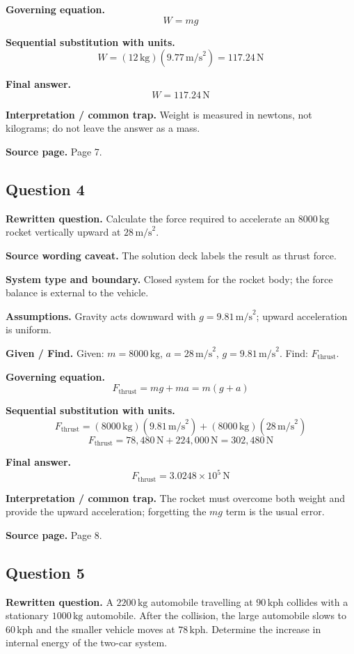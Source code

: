 \textbf{Governing equation.}
\[
W=mg
\]

\textbf{Sequential substitution with units.}
\[
W=(12\,\text{kg})(9.77\,\text{m/s}^2)=117.24\,\text{N}
\]

\textbf{Final answer.}
\[
\boxed{W=117.24\,\text{N}}
\]

\textbf{Interpretation / common trap.} Weight is measured in newtons, not kilograms; do not leave the answer as a mass.

\textbf{Source page.} Page 7.

\subsection*{Question 4}
\textbf{Rewritten question.} Calculate the force required to accelerate an $8000\,\text{kg}$ rocket vertically upward at $28\,\text{m/s}^2$.

\textbf{Source wording caveat.} The solution deck labels the result as thrust force.

\textbf{System type and boundary.} Closed system for the rocket body; the force balance is external to the vehicle.

\textbf{Assumptions.} Gravity acts downward with $g=9.81\,\text{m/s}^2$; upward acceleration is uniform.

\textbf{Given / Find.}
Given: $m=8000\,\text{kg}$, $a=28\,\text{m/s}^2$, $g=9.81\,\text{m/s}^2$.
Find: $F_{\text{thrust}}$.

\textbf{Governing equation.}
\[
F_{\text{thrust}}=mg+ma=m(g+a)
\]

\textbf{Sequential substitution with units.}
\[
F_{\text{thrust}}=(8000\,\text{kg})(9.81\,\text{m/s}^2)+(8000\,\text{kg})(28\,\text{m/s}^2)
\]
\[
F_{\text{thrust}}=78{,}480\,\text{N}+224{,}000\,\text{N}=302{,}480\,\text{N}
\]

\textbf{Final answer.}
\[
\boxed{F_{\text{thrust}}=3.0248\times10^5\,\text{N}}
\]

\textbf{Interpretation / common trap.} The rocket must overcome both weight and provide the upward acceleration; forgetting the $mg$ term is the usual error.

\textbf{Source page.} Page 8.

\subsection*{Question 5}
\textbf{Rewritten question.} A $2200\,\text{kg}$ automobile travelling at $90\,\text{kph}$ collides with a stationary $1000\,\text{kg}$ automobile. After the collision, the large automobile slows to $60\,\text{kph}$ and the smaller vehicle moves at $78\,\text{kph}$. Determine the increase in internal energy of the two-car system.

